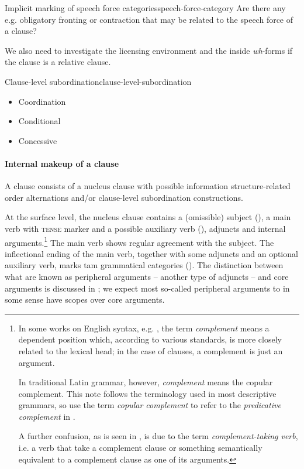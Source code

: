 \documentclass[a4paper, oneside, 12pt]{report}
\newcommand*{\term}[1]{\emph{#1}}
\newcommand{\form}[1]{\emph{#1}}
\newcommand*{\category}[1]{\textsc{#1}}
\begin{document}
\begin{todobox}{Implicit marking of speech force categories}{speech-force-category}
    Are there any e.g. obligatory fronting or contraction that may be related to the speech force of a clause?
    
    We also need to investigate the licensing environment
    and the inside \form{wh}-forms if the clause is a relative clause.
\end{todobox}

\begin{todobox}{Clause-level subordination}{clause-level-subordination}
    \begin{itemize}
        \item Coordination
        \item Conditional
        \item Concessive
    \end{itemize}
\end{todobox}

\paragraph*{Internal makeup of a clause}\label{sec:grammatical.clause.overview.internal}
A clause consists of a nucleus clause with possible information structure-related order alternations 
and/or clause-level subordination constructions.

At the surface level, the nucleus clause contains a (omissible) subject
(),
a main verb with \category{tense} marker and a possible auxiliary verb (),
adjuncts and internal arguments.\footnote{
    In some works on English syntax, e.g. \citet{cgel}, the term \term{complement} means a 
    dependent position which, according to various standards,
    is more closely related to the lexical head;
    in the case of clauses, a complement is just an argument.

    In traditional Latin grammar, however, \term{complement} means the copular complement. 
    This note follows the terminology used in most descriptive grammars,
    so use the term \term{copular complement} to refer to the \term{predicative complement} in \citet{cgel}.
    
    A further confusion, as is seen in , 
    is due to the term \term{complement-taking verb}, 
    i.e. a verb that take a complement clause 
    or something semantically equivalent to a complement clause
    as one of its arguments.
}
The main verb shows regular agreement with the subject.
The inflectional ending of the main verb, 
together with some adjuncts and an optional auxiliary verb,
marks \ac{tam} grammatical categories ().
The distinction between what are known as peripheral arguments
-- another type of adjuncts -- and core arguments
is discussed in ;
we expect most so-called peripheral arguments 
to in some sense have scopes over core arguments.
\end{document}
